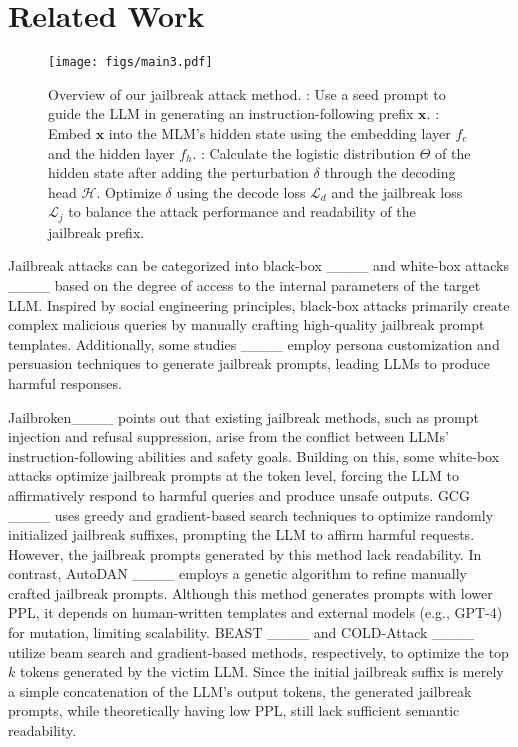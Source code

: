 \section{Related Work}
\begin{figure*}[htbp]
    \centering
    \texttt{[image: figs/main3.pdf]}
    \caption{Overview of our jailbreak attack method.
    : Use a seed prompt to guide the LLM in generating an instruction-following prefix $\mathbf{x}$. : Embed $\mathbf{x}$ into the MLM's hidden state using the embedding layer $f_e$ and the hidden layer $f_h$. : Calculate the logistic distribution \textbf{$\Theta$} of the hidden state after adding the perturbation $\delta$ through the decoding head $\mathcal{H}$. Optimize $\delta$ using the decode loss $\mathcal{L}_d$ and the jailbreak loss $\mathcal{L}_j$ to balance the attack performance and readability of the jailbreak prefix.}
    \label{fig:main}
\end{figure*}

Jailbreak attacks can be categorized into black-box ____ and white-box attacks ____ based on the degree of access to the internal parameters of the target LLM. Inspired by social engineering principles, black-box attacks primarily create complex malicious queries by manually crafting high-quality jailbreak prompt templates. Additionally, some studies  ____ employ persona customization and persuasion techniques to generate jailbreak prompts, leading LLMs to produce harmful responses. 

Jailbroken____ points out that existing jailbreak methods, such as prompt injection and refusal suppression, arise from the conflict between LLMs' instruction-following abilities and safety goals. 
Building on this, some white-box attacks optimize jailbreak prompts at the token level, forcing the LLM to affirmatively respond to harmful queries and produce unsafe outputs. GCG ____ uses greedy and gradient-based search techniques to optimize randomly initialized jailbreak suffixes, prompting the LLM to affirm harmful requests. However, the jailbreak prompts generated by this method lack readability. In contrast, AutoDAN  ____ employs a genetic algorithm to refine manually crafted jailbreak prompts. Although this method generates prompts with lower PPL, it depends on human-written templates and external models (e.g., GPT-4) for mutation, limiting scalability. BEAST  ____ and COLD-Attack  ____ utilize beam search and gradient-based methods, respectively, to optimize the top $k$ tokens generated by the victim LLM. Since the initial jailbreak suffix is merely a simple concatenation of the LLM’s output tokens, the generated jailbreak prompts, while theoretically having low PPL, still lack sufficient semantic readability. 

